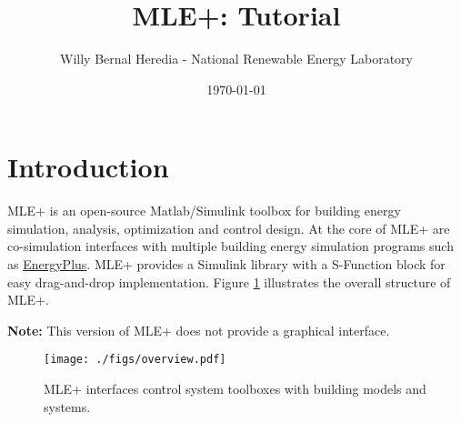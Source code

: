 \documentclass[11pt]{article}
\author{Willy Bernal Heredia - National Renewable Energy Laboratory}
\date{\today}
\title{MLE+: Tutorial}
\begin{document}
\maketitle
\tableofcontents



\section{Introduction}
\label{sec-1}

MLE+ is an open-source Matlab/Simulink toolbox for building energy simulation, analysis, optimization and control design. At the core of MLE+ are co-simulation interfaces with multiple building energy simulation programs such as \href{http://apps1.eere.energy.gov/buildings/energyplus/}{EnergyPlus}. MLE+ provides a Simulink library with a S-Function block for easy drag-and-drop implementation. Figure \ref{fig:overview} illustrates the overall structure of MLE+.

\textbf{Note:} This version of MLE+ does not provide a graphical interface. 

\begin{figure}[htb]
\centering
\texttt{[image: ./figs/overview.pdf]}
\caption{\label{fig:overview}MLE+ interfaces control system toolboxes with building models and systems.}
\end{figure}
\end{document}

